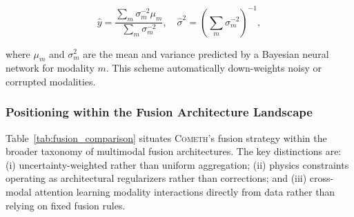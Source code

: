 \documentclass[usenatbib]{mnras}
\begin{document}
\begin{equation}\label{eq:uncertainty_fusion}
\hat{y} = \frac{\sum_m \sigma_m^{-2} \mu_m}{\sum_m \sigma_m^{-2}}, \quad \hat{\sigma}^2 = \left(\sum_m \sigma_m^{-2}\right)^{-1},
\end{equation}

where $\mu_m$ and $\sigma_m^2$ are the mean and variance predicted by a Bayesian neural network for modality $m$. This scheme automatically down-weights noisy or corrupted modalities.

\subsubsection{Positioning within the Fusion Architecture Landscape}

Table~\ref{tab:fusion_comparison} situates \textsc{Cometh}'s fusion strategy within the broader taxonomy of multimodal fusion architectures. The key distinctions are: (i) uncertainty-weighted rather than uniform aggregation; (ii) physics constraints operating as architectural regularizers rather than corrections; and (iii) cross-modal attention learning modality interactions directly from data rather than relying on fixed fusion rules.
\end{document}

